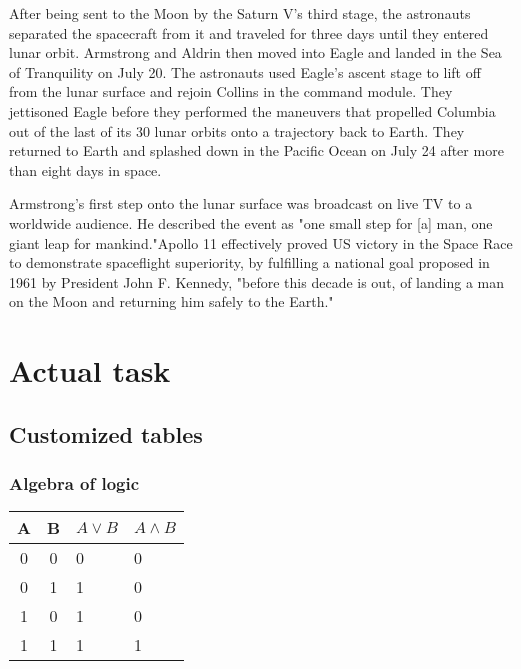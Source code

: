 \documentclass[14pt,a4paper]{report}
\begin{document}
After being sent to the Moon by the Saturn V's third stage, the astronauts separated the spacecraft from it and traveled for three days until they entered lunar orbit. Armstrong and Aldrin then moved into Eagle and landed in the Sea of Tranquility on July 20. The astronauts used Eagle's ascent stage to lift off from the lunar surface and rejoin Collins in the command module. They jettisoned Eagle before they performed the maneuvers that propelled Columbia out of the last of its 30 lunar orbits onto a trajectory back to Earth. They returned to Earth and splashed down in the Pacific Ocean on July 24 after more than eight days in space.

Armstrong's first step onto the lunar surface was broadcast on live TV to a worldwide audience. He described the event as "one small step for [a] man, one giant leap for mankind."Apollo 11 effectively proved US victory in the Space Race to demonstrate spaceflight superiority, by fulfilling a national goal proposed in 1961 by President John F. Kennedy, "before this decade is out, of landing a man on the Moon and returning him safely to the Earth\cite{korotev2001new}."

\clearpage

\part{Actual task}
\chapter{Customized tables}

\section{Algebra of logic}
\begin{tabular}{| c | c | l | l |}
\hline
  A & B & $ A \vee B $ &  $ A \wedge B $ \\
  \hline
  0 & 0 & 0 & 0 \\
  \hline
  0 & 1 & 1 & 0 \\
  \hline
  1 & 0 & 1 & 0 \\
  \hline
  1 & 1 & 1 & 1 \\
  \hline
\end{tabular} \\
\end{document}
